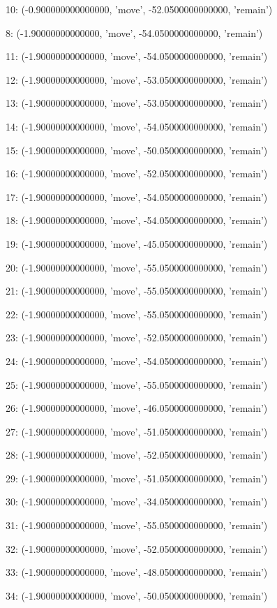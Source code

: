 10: (-0.900000000000000, 'move', -52.0500000000000, 'remain')


8: (-1.90000000000000, 'move', -54.0500000000000, 'remain')


11: (-1.90000000000000, 'move', -54.0500000000000, 'remain')


12: (-1.90000000000000, 'move', -53.0500000000000, 'remain')


13: (-1.90000000000000, 'move', -53.0500000000000, 'remain')


14: (-1.90000000000000, 'move', -54.0500000000000, 'remain')


15: (-1.90000000000000, 'move', -50.0500000000000, 'remain')


16: (-1.90000000000000, 'move', -52.0500000000000, 'remain')


17: (-1.90000000000000, 'move', -54.0500000000000, 'remain')


18: (-1.90000000000000, 'move', -54.0500000000000, 'remain')


19: (-1.90000000000000, 'move', -45.0500000000000, 'remain')


20: (-1.90000000000000, 'move', -55.0500000000000, 'remain')


21: (-1.90000000000000, 'move', -55.0500000000000, 'remain')


22: (-1.90000000000000, 'move', -55.0500000000000, 'remain')


23: (-1.90000000000000, 'move', -52.0500000000000, 'remain')


24: (-1.90000000000000, 'move', -54.0500000000000, 'remain')


25: (-1.90000000000000, 'move', -55.0500000000000, 'remain')


26: (-1.90000000000000, 'move', -46.0500000000000, 'remain')


27: (-1.90000000000000, 'move', -51.0500000000000, 'remain')


28: (-1.90000000000000, 'move', -52.0500000000000, 'remain')


29: (-1.90000000000000, 'move', -51.0500000000000, 'remain')


30: (-1.90000000000000, 'move', -34.0500000000000, 'remain')


31: (-1.90000000000000, 'move', -55.0500000000000, 'remain')


32: (-1.90000000000000, 'move', -52.0500000000000, 'remain')


33: (-1.90000000000000, 'move', -48.0500000000000, 'remain')


34: (-1.90000000000000, 'move', -50.0500000000000, 'remain')


